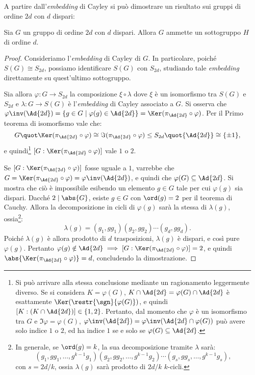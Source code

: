 \documentclass[12pt]{scrartcl}
\begin{document}
	A partire dall'\textit{embedding} di Cayley si può dimostrare un risultato
	sui gruppi di ordine $2d$ con $d$ dispari:
	
	\begin{proposition}
		Sia $G$ un gruppo di ordine $2d$ con $d$ dispari. Allora $G$ ammette
		un sottogruppo $H$ di ordine $d$.
	\end{proposition}
	
	\begin{proof}
		Consideriamo l'\textit{embedding} di Cayley di $G$. In particolare,
		poiché $S(G) \cong S_{2d}$, possiamo identificare $S(G)$ con
		$S_{2d}$, studiando tale \textit{embedding} direttamente su quest'ultimo
		sottogruppo. \medskip
		
		
		Sia allora $\varphi : G \to S_{2d}$ la composizione $\xi \circ \lambda$ dove
		$\xi$ è un isomorfismo tra $S(G)$ e $S_{2d}$ e $\lambda : G \to S(G)$ è l'\textit{embedding} di Cayley associato a $G$.
		Si osserva che $\varphi\inv(\Ad{2d}) = \{ g \in G \mid \varphi(g) \in \Ad{2d} \} =
		\Ker (\pi_{\Ad{2d}} \circ \varphi)$. Per il Primo teorema di isomorfismo vale
		che:
		\[ G \quot \Ker (\pi_{\Ad{2d}} \circ \varphi) \cong \Im (\pi_{\Ad{2d}} \circ \varphi) \leq
		S_{2d} \quot {\Ad{2d}} \cong \{\pm 1\}, \]
		e quindi\footnote{
			Si può arrivare alla stessa conclusione mediante un ragionamento leggermente
			diverso. Se si considera $K = \varphi(G)$, $K \cap \Ad{2d} = \varphi(G) \cap \Ad{2d}$ è esattamente $\Ker(\restr{\sgn}{\varphi(G)})$, e quindi
			$[K : (K \cap \Ad{2d})] \in \{1, 2\}$. Pertanto, dal momento che $\varphi$
			è un isomorfismo tra $G$ e $\Im \varphi = \varphi(G)$, $\varphi\inv(\Ad{2d}) =
			\varphi\inv(\Ad{2d} \cap \varphi(G))$ può avere solo indice $1$ o $2$, ed
			ha indice $1$ se e solo se $\varphi(G) \subseteq \Ad{2d}$.
		} $[G : \Ker (\pi_{\Ad{2d}} \circ \varphi)]$ vale $1$ o $2$. \medskip
		
		
		Se
		$[G : \Ker (\pi_{\Ad{2d}} \circ \varphi)]$ fosse uguale a $1$,
		varrebbe che $G = \Ker (\pi_{\Ad{2d}} \circ \varphi) = \varphi\inv(\Ad{2d})$, e quindi che
		$\varphi(G) \subseteq \Ad{2d}$. Si mostra che ciò è impossibile esibendo un elemento
		$g \in G$ tale per cui $\varphi(g)$ sia dispari. Dacché $2 \mid \abs{G}$,
		esiste $g \in G$ con $\ord(g) = 2$ per il teorema di Cauchy. Allora la
		decomposizione in cicli di $\varphi(g)$ sarà la stessa di $\lambda(g)$, ossia\footnote{
			In generale, se $\ord(g) = k$, la sua decomposizione tramite $\lambda$ sarà:
			\[ (g_1, g g_1, \ldots, g^{k-1} g_1)  (g_2, g g_2, \ldots, g^{k-1} g_2) \cdots (g_s, g g_s, \ldots, g^{k-1} g_s), \]
			con $s = 2d/k$, ossia $\lambda(g)$ sarà prodotto di $2d/k$ $k$-cicli.
		}:
		\[ \lambda(g) = (g_1, g g_1) (g_2, g g_2) \cdots (g_d, g g_d). \]
		Poiché $\lambda(g)$ è allora prodotto di $d$ trasposizioni, $\lambda(g)$ è dispari,
		e così pure $\varphi(g)$. Pertanto $\varphi(g) \notin \Ad{2d} \implies
		[G : \Ker (\pi_{\Ad{2d}} \circ \varphi)] = 2$, e quindi
		$\abs{ \Ker (\pi_{\Ad{2d}} \circ \varphi)} = d$, concludendo la dimostrazione.
	\end{proof} \bigskip
	
\end{document}
